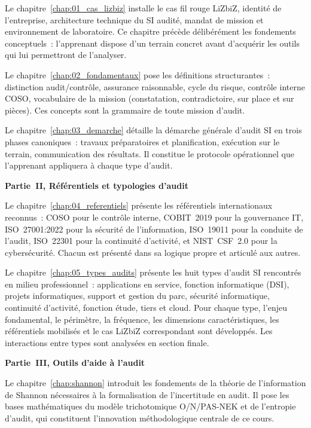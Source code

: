 Le chapitre~\ref{chap:01_cas_lizbiz} installe le cas fil rouge LiZbiZ, identité de l'entreprise, architecture technique du SI audité, mandat de mission et environnement de laboratoire. Ce chapitre précède délibérément les fondements conceptuels~: l'apprenant dispose d'un terrain concret avant d'acquérir les outils qui lui permettront de l'analyser.

Le chapitre~\ref{chap:02_fondamentaux} pose les définitions structurantes~: distinction audit/contrôle, assurance raisonnable, cycle du risque, contrôle interne COSO, vocabulaire de la mission (constatation, contradictoire, sur place et sur pièces). Ces concepts sont la grammaire de toute mission d'audit.

Le chapitre~\ref{chap:03_demarche} détaille la démarche générale d'audit SI en trois phases canoniques~: travaux préparatoires et planification, exécution sur le terrain, communication des résultats. Il constitue le protocole opérationnel que l'apprenant appliquera à chaque type d'audit.

\medskip
\noindent\textbf{Partie~II, Référentiels et typologies d'audit}

Le chapitre~\ref{chap:04_referentiels} présente les référentiels internationaux reconnus~: COSO pour le contrôle interne, COBIT~2019 pour la gouvernance IT, ISO~27001:2022 pour la sécurité de l'information, ISO~19011 pour la conduite de l'audit, ISO~22301 pour la continuité d'activité, et NIST~CSF~2.0 pour la cybersécurité. Chacun est présenté dans sa logique propre et articulé aux autres.

Le chapitre~\ref{chap:05_types_audits} présente les huit types d'audit SI rencontrés en milieu professionnel~: applications en service, fonction informatique (DSI), projets informatiques, support et gestion du parc, sécurité informatique, continuité d'activité, fonction étude, tiers et cloud. Pour chaque type, l'enjeu fondamental, le périmètre, la fréquence, les dimensions caractéristiques, les référentiels mobilisés et le cas LiZbiZ correspondant sont développés. Les interactions entre types sont analysées en section finale.

\medskip
\noindent\textbf{Partie~III, Outils d'aide à l'audit}

Le chapitre~\ref{chap:shannon} introduit les fondements de la théorie de l'information de Shannon nécessaires à la formalisation de l'incertitude en audit. Il pose les bases mathématiques du modèle trichotomique O/N/PAS-NEK et de l'entropie d'audit, qui constituent l'innovation méthodologique centrale de ce cours.

